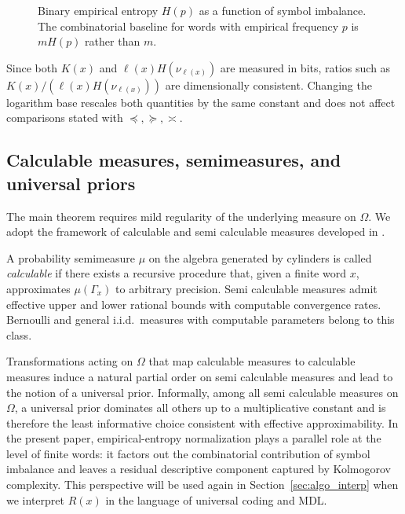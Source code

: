 \documentclass[12pt]{article}
\newcommand{\dom}{\preceq}
\newcommand{\rdom}{\succeq}
\newcommand{\asym}{\asymp}
\begin{document}
\begin{figure}[htb]
\centering
{}
\caption{\small Binary empirical entropy $H(p)$ as a function of symbol imbalance. The
combinatorial baseline for words with empirical frequency $p$ is $mH(p)$ rather
than $m$.}
\label{fig:entropy_curve1}
\end{figure}

Since both $K(x)$ and $\ell(x)H(\nu_{\ell(x)})$ are measured in bits, ratios such as
$K(x)/(\ell(x)H(\nu_{\ell(x)}))$ are dimensionally consistent. Changing the
logarithm base rescales both quantities by the same constant and does not affect
comparisons stated with $\dom,\rdom,\asym$.

\subsection{Calculable measures, semimeasures, and universal priors}
\label{sec:prelim_measures}

The main theorem requires mild regularity of the underlying measure on $\Omega$.
We adopt the framework of calculable and semi calculable measures developed in
\citet{Vidakovic1981Thesis, Vidakovic1984MartinLof, Vidakovic1988}.

A probability semimeasure $\mu$ on the algebra generated by cylinders is called
\emph{calculable} if there exists a recursive procedure that, given a finite word
$x$, approximates $\mu(\Gamma_x)$ to arbitrary precision. Semi calculable measures
admit effective upper and lower rational bounds with computable convergence rates.
Bernoulli and general i.i.d.\ measures with computable parameters belong to this
class.

Transformations acting on $\Omega$ that map calculable measures to calculable
measures induce a natural partial order on semi calculable measures and lead to
the notion of a universal prior. Informally, among all semi calculable measures
on $\Omega$, a universal prior dominates all others up to a multiplicative
constant and is therefore the least informative choice consistent with effective
approximability. In the present paper, empirical-entropy normalization plays a
parallel role at the level of finite words: it factors out the combinatorial
contribution of symbol imbalance and leaves a residual descriptive component
captured by Kolmogorov complexity. This perspective will be used again in
Section~\ref{sec:algo_interp} when we interpret $R(x)$ in the language of
universal coding and MDL.
\end{document}
